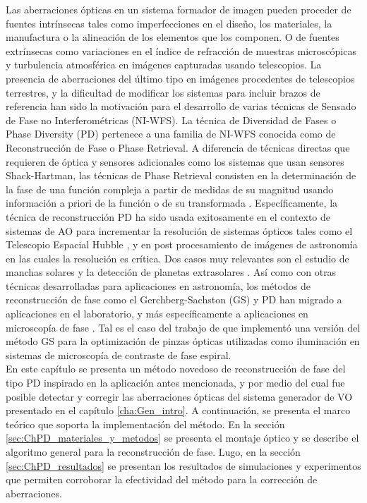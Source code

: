 Las aberraciones ópticas en un sistema formador de imagen pueden
proceder de fuentes intrínsecas tales como imperfecciones en el
diseño, los materiales, la manufactura o la alineación de los
elementos que los componen. O de fuentes extrínsecas como variaciones
en el índice de refracción de muestras microscópicas y turbulencia atmosférica en
imágenes capturadas usando telescopios. La presencia de aberraciones
del último tipo en imágenes procedentes de telescopios terrestres, y
la dificultad de modificar los sistemas para incluir brazos de referencia han sido la motivación para
el desarrollo de varias técnicas de Sensado de Fase no
Interferométricas (NI-WFS). La técnica de Diversidad de Fases o Phase
Diversity (PD) pertenece a una familia de NI-WFS conocida como de
Reconstrucción de Fase o Phase Retrieval. A diferencia de técnicas
directas que requieren de óptica y sensores adicionales como los
sistemas que usan sensores Shack-Hartman, las técnicas de Phase
Retrieval consisten en la determinación de la fase de una función
compleja a partir de medidas de su magnitud usando 
información a priori de la función o de su transformada . 
Específicamente, la técnica de reconstrucción  PD ha sido usada
exitosamente en el contexto de sistemas de AO para incrementar la resolución de sistemas ópticos
tales como el Telescopio Espacial Hubble , y en
post procesamiento de imágenes de astronomía en las cuales la
resolución es crítica. Dos casos muy relevantes son el estudio de
manchas solares y la detección de planetas extrasolares . 
Así como con otras técnicas desarrolladas para aplicaciones en
astronomía, los métodos de reconstrucción de fase como el
Gerchberg-Sachston (GS) y PD han migrado a aplicaciones en el
laboratorio, y más específicamente a aplicaciones en microscopía de
fase . Tal es el caso
del trabajo de  que implementó una versión del
método GS para la optimización de pinzas ópticas utilizadas como
iluminación en sistemas de microscopía de contraste de fase espiral. \\
En este capítulo se presenta un método novedoso de reconstrucción de
fase del tipo PD inspirado en la aplicación antes mencionada, y por
medio del cual fue posible detectar y corregir las aberraciones ópticas
del sistema generador de VO presentado en el capítulo
\ref{cha:Gen_intro}.  A continuación, se presenta el marco teórico que
soporta la implementación del método. En la sección
\ref{sec:ChPD_materiales_y_metodos} se presenta el montaje óptico y se
describe el algoritmo general para la reconstrucción de fase. Lugo, en
la sección \ref{sec:ChPD_resultados} se presentan los resultados de
simulaciones y experimentos que permiten corroborar la efectividad del
método para la corrección de aberraciones. 

